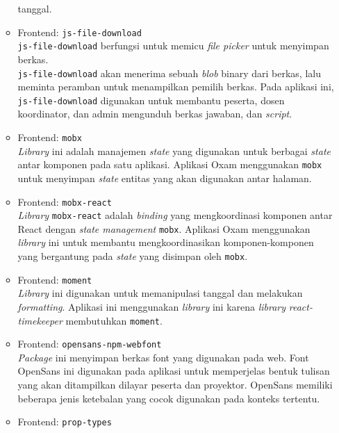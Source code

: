 \begin{itemize}
\begin{itemize}
                    tanggal.
                \item Frontend: \texttt{js-file-download} \\
                    \texttt{js-file-download} berfungsi untuk memicu \textit{file picker} untuk menyimpan berkas.\\
                    \texttt{js-file-download} akan menerima sebuah \textit{blob} binary dari berkas, lalu meminta
                    peramban untuk menampilkan pemilih berkas. Pada aplikasi ini, \texttt{js-file-download}
                    digunakan untuk membantu peserta, dosen koordinator, dan admin mengunduh berkas jawaban,
                    dan \textit{script}.
                \item Frontend: \texttt{mobx} \\
                    \textit{Library} ini adalah manajemen \textit{state} yang digunakan untuk berbagai \textit{state}
                    antar komponen pada satu aplikasi. Aplikasi Oxam menggunakan \texttt{mobx} untuk menyimpan 
                    \textit{state} entitas yang akan digunakan antar halaman.
                \item Frontend: \texttt{mobx-react} \\
                    \textit{Library} \texttt{mobx-react} adalah \textit{binding} yang mengkoordinasi komponen
                    antar React dengan \textit{state management} \texttt{mobx}. Aplikasi Oxam menggunakan 
                    \textit{library} ini untuk membantu mengkoordinasikan komponen-komponen yang bergantung
                    pada \textit{state} yang disimpan oleh \texttt{mobx}.
                \item Frontend: \texttt{moment} \\
                    \textit{Library} ini digunakan untuk memanipulasi tanggal dan melakukan \textit{formatting}.
                    Aplikasi ini menggunakan \textit{library} ini karena \textit{library} \textit{react-timekeeper}
                    membutuhkan \texttt{moment}.
                \item Frontend: \texttt{opensans-npm-webfont} \\
                    \textit{Package} ini menyimpan berkas font yang digunakan pada web. Font OpenSans ini
                    digunakan pada aplikasi untuk memperjelas bentuk tulisan yang akan ditampilkan dilayar peserta
                    dan proyektor. OpenSans memiliki beberapa jenis ketebalan yang cocok digunakan pada konteks
                    tertentu.
                \item Frontend: \texttt{prop-types} \\

\end{itemize}
\end{itemize}
